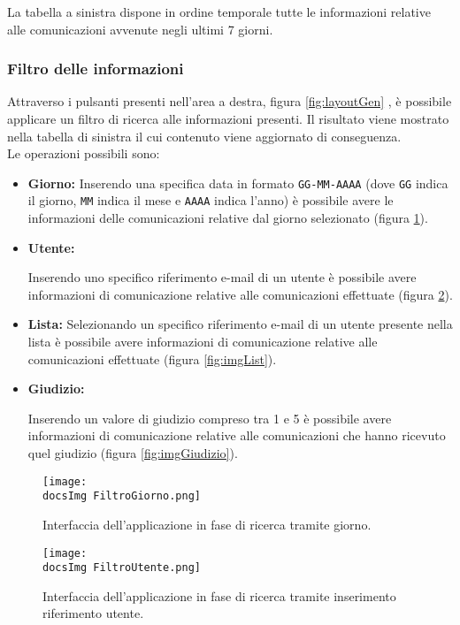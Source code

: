 {{{La tabella a sinistra dispone in ordine temporale tutte le informazioni relative alle comunicazioni avvenute negli ultimi 7 giorni.
}

\subsubsection{Filtro delle informazioni}{
Attraverso i pulsanti presenti nell'area a destra, figura \ref{fig:layoutGen} , è possibile applicare un filtro di ricerca alle informazioni presenti. Il risultato viene mostrato nella tabella di sinistra il cui contenuto viene aggiornato di conseguenza.\\
Le operazioni possibili sono:
\begin{itemize}
	\item \textbf{Giorno: }{Inserendo una specifica data in formato \texttt{GG-MM-AAAA} (dove \texttt{GG} indica il giorno, \texttt{MM} indica il mese e \texttt{AAAA} indica l'anno) è possibile avere le informazioni delle comunicazioni relative dal giorno selezionato (figura \ref{fig:imgGiorno}).
	}
	
	\item \textbf{Utente: }{Inserendo uno specifico riferimento e-mail di un utente è possibile avere informazioni di comunicazione relative alle comunicazioni effettuate (figura \ref{fig:imgLogin}).

	}
	\item \textbf{Lista: }{Selezionando un specifico riferimento e-mail di un utente presente nella lista è possibile avere informazioni di comunicazione relative alle comunicazioni effettuate (figura \ref{fig:imgList}).
}

	\item \textbf{Giudizio: }{Inserendo un valore di giudizio compreso tra 1 e 5 è possibile avere informazioni di comunicazione relative alle comunicazioni che hanno ricevuto quel giudizio (figura \ref{fig:imgGiudizio}).

}
\end{itemize}

}
\begin{figure}[h!]
	\centering
		\texttt{[image: \\docsImg FiltroGiorno.png]}
		\caption{Interfaccia dell'applicazione in fase di ricerca tramite giorno.}
		\label{fig:imgGiorno} 
\end{figure}

\begin{figure}[h!]
	\centering
		\texttt{[image: \\docsImg FiltroUtente.png]}
		\caption{Interfaccia dell'applicazione in fase di ricerca tramite inserimento riferimento utente.} 
		\label{fig:imgLogin}
\end{figure}

}}

